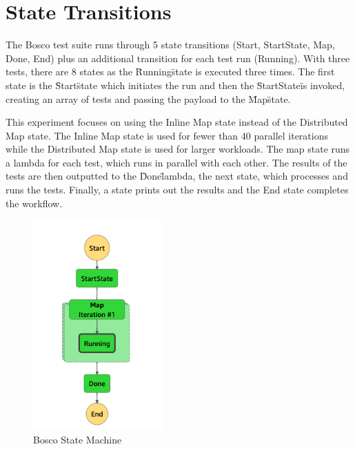 \documentclass[12pt,a4paper,titlepage]{report}
\begin{document}
\section{State Transitions}

The Bosco test suite runs through 5 state transitions (Start, StartState, Map, Done, End) plus an additional transition for each test run (Running). With three tests, there are 8 states as the \"Running\" state is executed three times. The first state is the \"Start\" state which initiates the run and then the \"StartState\" is invoked, creating an array of tests and passing the payload to the \"Map\" state.

This experiment focuses on using the Inline Map state instead of the Distributed Map state. The Inline Map state is used for fewer than 40 parallel iterations while the Distributed Map state is used for larger workloads. The map state runs a lambda for each test, which runs in parallel with each other. The results of the tests are then outputted to the \"Done\" lambda, the next state, which processes and runs the tests. Finally, a state prints out the results and the End state completes the workflow.

\begin{figure}[h]
  \centering
  \includegraphics[width=5cm]{./diagrams/step_function}
  \caption{Bosco State Machine}
\end{figure}
\end{document}
